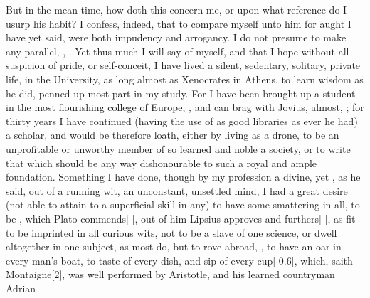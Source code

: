 {But in the mean time, how doth this concern me, or upon what reference
do I usurp his habit? I confess, indeed, that to compare myself unto
him for aught I have yet said, were both impudency and arrogancy. I do
not presume to make any parallel, , . Yet thus much I
will say of myself, and that I hope without all suspicion of pride, or
self-conceit, I have lived a silent, sedentary, solitary, private life,
 in the University, as long almost as Xenocrates in
Athens,  to learn wisdom as he did, penned up most part
in my study. For I have been brought up a student in the most
flourishing college of Europe,  , and can brag
with Jovius, almost, ; for thirty years I
have continued (having the use of as good libraries as ever he had)
a scholar, and would be therefore loath, either by living as a drone,
to be an unprofitable or unworthy member of so learned and noble a
society, or to write that which should be any way dishonourable to such
a royal and ample foundation. Something I have done, though by my
profession a divine, yet , as he said, out of
a running wit, an unconstant, unsettled mind, I had a great desire (not
able to attain to a superficial skill in any) to have some smattering
in all, to be ,  which
Plato commends[-\baselineskip], out of him Lipsius approves and furthers[-\baselineskip], as
fit to be imprinted in all curious wits, not to be a slave of one
science, or dwell altogether in one subject, as most do, but to rove
abroad, , to have an oar in every man's boat, to 
taste of every dish, and sip of every cup[-0.6\baselineskip], which, saith Montaigne[2\baselineskip],
was well performed by Aristotle, and his learned countryman Adrian
}
